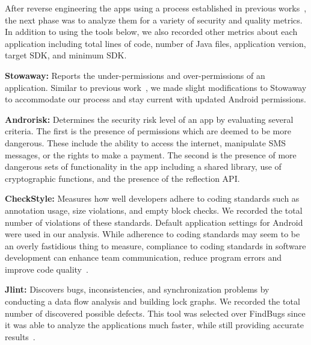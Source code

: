 \documentclass{llncs}
\begin{document}
After reverse engineering the apps using a process established in previous works~\cite{Lee_2013,6687155}, the next phase was to analyze them for a variety of security and quality metrics. In addition to using the tools below, we also recorded other metrics about each application including total lines of code, number of Java files, application version, target SDK, and minimum SDK.


\textbf{Stowaway:} Reports the under-permissions and over-permissions of an application. Similar to previous work~\cite{6624000}, we made slight modifications to Stowaway to accommodate our process and stay current with updated Android permissions.

\textbf{Androrisk:} Determines the security risk level of an app by evaluating several criteria. The first is the presence of permissions which are deemed to be more dangerous. These include the ability to access the internet, manipulate SMS messages, or the rights to make a payment. The second is the presence of more dangerous sets of functionality in the app including a shared library, use of cryptographic functions, and the presence of the reflection API.


\textbf{CheckStyle:} Measures how well developers adhere to coding standards such as annotation usage, size violations, and empty block checks. We recorded the total number of violations of these standards. Default application settings for Android were used in our analysis. While adherence to coding standards may seem to be an overly fastidious thing to measure, compliance to coding standards in software development can enhance team communication, reduce program errors and improve code quality~\cite{Li:2005:ETC:1095714.1095770, li2006using}.

\textbf{Jlint:} Discovers bugs, inconsistencies, and synchronization problems by conducting a data flow analysis and building lock graphs. We recorded the total number of discovered possible defects. This tool was selected over FindBugs since it was able to analyze the applications much faster, while still providing accurate results~\cite{rutar2004comparison}.
\end{document}
